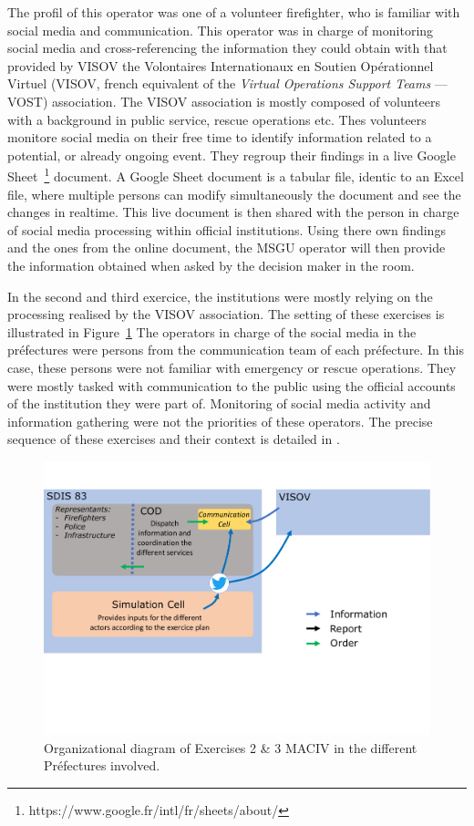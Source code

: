 The profil of this operator was one of a volunteer firefighter, who is familiar with social media and communication.
This operator was in charge of monitoring social media and cross-referencing the information they could obtain with that provided by VISOV the Volontaires Internationaux en Soutien Opérationnel Virtuel (VISOV, french equivalent of the \textit{Virtual Operations Support Teams} — VOST) association.
The VISOV association is mostly composed of volunteers with a background in public service, rescue operations etc.
Thes volunteers monitore social media on their free time to identify information related to a potential, or already ongoing event.
They regroup their findings in a live Google Sheet~\footnote{https://www.google.fr/intl/fr/sheets/about/} document.
A Google Sheet document is a tabular file, identic to an Excel file, where multiple persons can modify simultaneously the document and see the changes in realtime.
This live document is then shared with the person in charge of social media processing within official institutions.
Using there own findings and the ones from the online document, the MSGU operator will then provide the information obtained when asked by the decision maker in the room.

In the second and third exercice, the institutions were mostly relying on the processing realised by the VISOV association.
The setting of these exercises is illustrated in Figure~\ref{information:exercice-prefecture}
The operators in charge of the social media in the préfectures were persons from the communication team of each préfecture.
In this case, these persons were not familiar with emergency or rescue operations.
They were mostly tasked with communication to the public using the official accounts of the institution they were part of.
Monitoring of social media activity and information gathering were not the priorities of these operators.
The precise sequence of these exercises and their context is detailed in \textcite{batardIntegrerContributionsCitoyennes2021}.

\begin{figure}[htb]
    \centering
    \includegraphics[width=\textwidth]{figures/chap-3/prefectures.pdf}
    \caption{Organizational diagram of Exercises 2 \& 3 MACIV in the different Préfectures involved.}
    \label{information:exercice-prefecture}
\end{figure}

